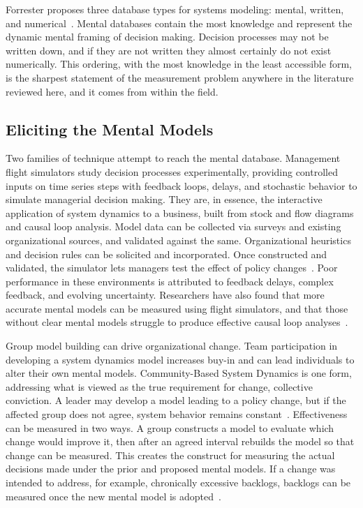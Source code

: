 \documentclass{csimq}
\begin{document}
Forrester proposes three database types for systems modeling: mental, written,
and numerical~\cite{forrester2009}. Mental databases contain the most knowledge
and represent the dynamic mental framing of decision making. Decision processes
may not be written down, and if they are not written they almost certainly do
not exist numerically. This ordering, with the most knowledge in the least
accessible form, is the sharpest statement of the measurement problem anywhere in the
literature reviewed here, and it comes from within the field.

\subsection{Eliciting the Mental Models}

Two families of technique attempt to reach the mental database. Management flight simulators study decision processes experimentally,
providing controlled inputs on time series steps with feedback loops, delays,
and stochastic behavior to simulate managerial decision making. They are, in
essence, the interactive application of system dynamics to a business, built
from stock and flow diagrams and causal loop analysis. Model data can be
collected via surveys and existing organizational sources, and validated against
the same. Organizational heuristics and decision rules can be solicited and
incorporated. Once constructed and validated, the simulator lets managers test
the effect of policy changes~\cite{papageorgiou2008}. Poor performance in these
environments is attributed to feedback delays, complex feedback, and evolving
uncertainty. Researchers have also found that more accurate mental models can be
measured using flight simulators, and that those without clear mental models
struggle to produce effective causal loop analyses~\cite{kunc2016}.

Group model building can drive organizational change. Team participation
in developing a system dynamics model increases buy-in and can lead individuals
to alter their own mental models. Community-Based System Dynamics is one form,
addressing what is viewed as the true requirement for change, collective
conviction. A leader may develop a model leading to a policy change, but if the
affected group does not agree, system behavior remains
constant~\cite{hovmand2013}. Effectiveness can be measured in two ways. A group constructs a model to evaluate which change would improve it, then
after an agreed interval rebuilds the model so that change can
be measured. This creates the construct for measuring the actual decisions made under the prior and
proposed mental models. If a change was intended to address, for example,
chronically excessive backlogs, backlogs can be measured once the new mental
model is adopted~\cite{kunc2016}.
\end{document}
